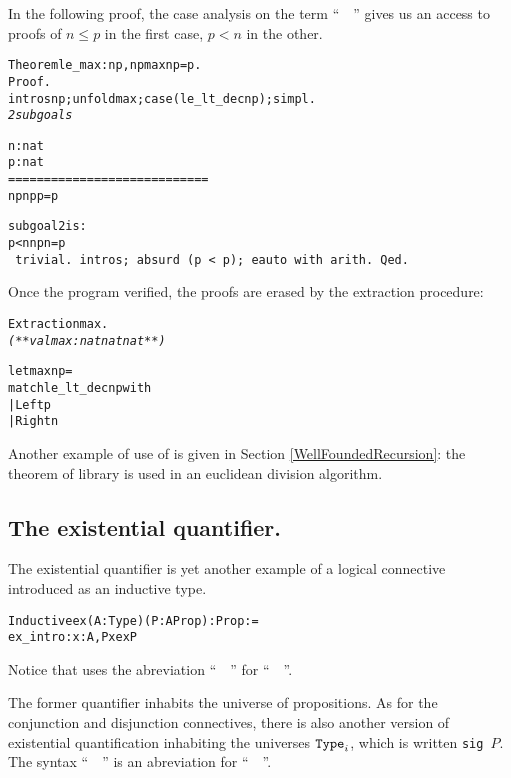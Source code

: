 \documentclass[11pt]{article}
\begin{document}
In the following proof, the case analysis on the term
``~~'' gives us an access to proofs
of $n\leq p$ in the first case, $p<n$ in the other.

\begin{alltt}
Theorem le_max : {\prodsym} n p, n {\coqle} p {\arrow} max n p = p.
Proof.
 intros n p ; unfold max ; case (le_lt_dec n p); simpl.
\it
2 subgoals
  
  n : nat
  p : nat
  ============================
   n {\coqle} p {\arrow} n {\coqle} p {\arrow} p = p

subgoal 2 is:
 p < n {\arrow} n {\coqle} p {\arrow} n = p
\tt
 trivial.
 intros; absurd (p < p); eauto with arith.
Qed.
\end{alltt}


 Once the program verified, the proofs are
erased by the extraction procedure:

\begin{alltt}
Extraction max.
\it
(** val max : nat {\arrow} nat {\arrow} nat **)

let max n p =
  match le_lt_dec n p with
    | Left {\arrow} p
    | Right {\arrow} n
\end{alltt}

Another example of use of  is given  in Section
\ref{WellFoundedRecursion}: the theorem  of
library  is used in an euclidean division
algorithm.

\subsection{The existential quantifier.}\label{ex-def}
The existential quantifier is yet another example of a logical
connective introduced as an inductive type.

\begin{alltt}
Inductive ex (A : Type) (P : A \arrow{} Prop) : Prop :=
    ex_intro : {\prodsym} x : A, P x \arrow{} ex P
\end{alltt}

Notice that {\coq} uses the abreviation ``~~''
for \linebreak ``~~''.


\noindent The former quantifier inhabits the universe of propositions.
As for the conjunction and disjunction connectives, there is also another
version of existential quantification inhabiting the universes $\texttt{Type}_i$,
which is written \texttt{sig $P$}. The syntax
``~~'' is an abreviation for ``~~''.
\end{document}

